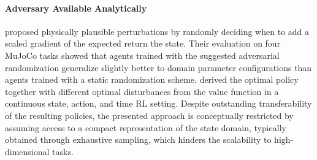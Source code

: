 \documentclass[utf8]{frontiersSCNS} %
\begin{document}
\paragraph*{Adversary Available Analytically}
%
\citet{Mandlekar_Savarese_17} proposed physically plausible perturbations by randomly deciding when to add a scaled gradient of the expected return \wrt the state.
Their \simtosim evaluation on four MuJoCo tasks showed that agents trained with the suggested adversarial randomization generalize slightly better to domain parameter configurations than agents trained with a static randomization scheme.
%
\citet{Lutter_Garg_21_RSS} derived the optimal policy together with different optimal disturbances from the value function in a continuous state, action, and time \ac{RL} setting.
Despite outstanding \simtoreal transferability of the resulting policies, the presented approach is conceptually restricted by assuming access to a compact representation of the state domain, typically obtained through exhaustive sampling, which hinders the scalability to high-dimensional tasks.
\end{document}
